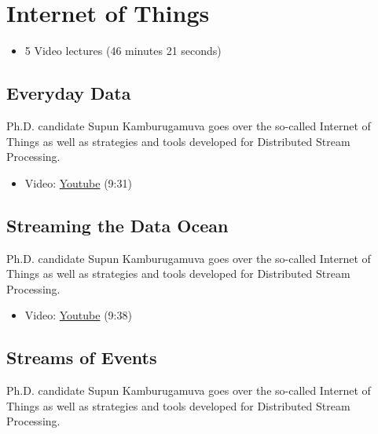 
\FILENAME

\section{Internet of Things}\label{internet-of-things}

\begin{itemize}

\item
  5 Video lectures (46 minutes 21 seconds)
\end{itemize}

\subsection{Everyday Data}\label{everyday-data}

Ph.D. candidate Supun Kamburugamuva goes over the so-called Internet of
Things as well as strategies and tools developed for Distributed Stream
Processing.

\begin{itemize}

\item
  Video:
  \href{https://www.youtube.com/watch?time_continue=9\&v=brv48Tg7Zyw}{Youtube}
  (9:31)
\end{itemize}

\subsection{Streaming the Data Ocean}\label{streaming-the-data-ocean}

Ph.D. candidate Supun Kamburugamuva goes over the so-called Internet of
Things as well as strategies and tools developed for Distributed Stream
Processing.

\begin{itemize}

\item
  Video: \href{https://www.youtube.com/watch?v=hTbveHCjAo4}{Youtube}
  (9:38)
\end{itemize}

\subsection{Streams of Events}\label{streams-of-events}

Ph.D. candidate Supun Kamburugamuva goes over the so-called Internet of
Things as well as strategies and tools developed for Distributed Stream
Processing.

